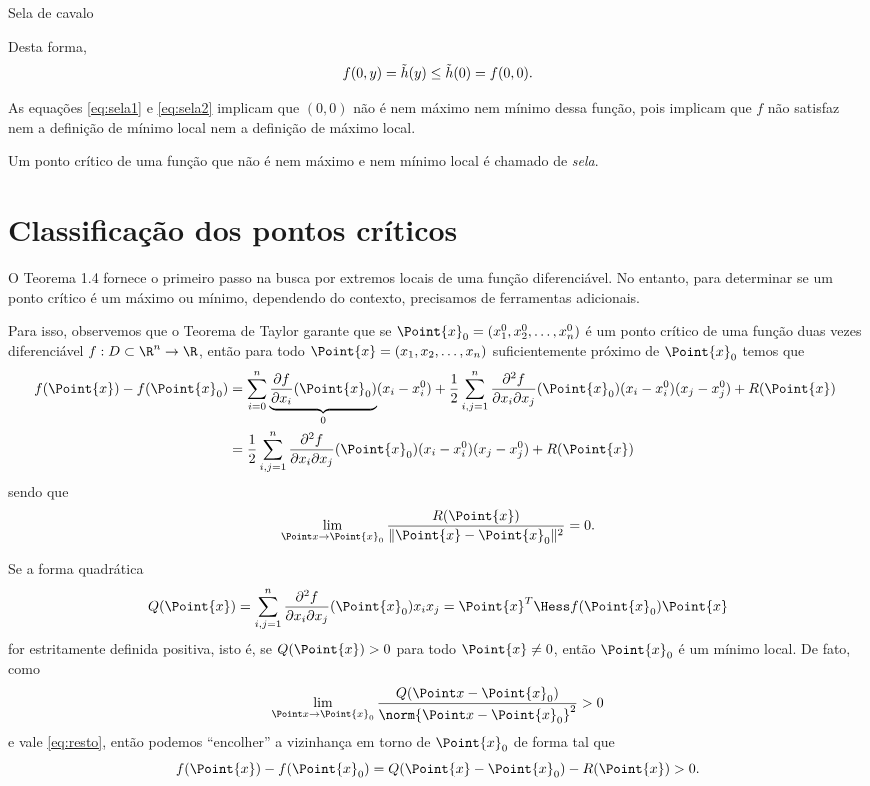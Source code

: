\begin{example}{Sela de cavalo}{}
\begin{figure}[H]
    \caption{}
    \label{fig:sela2}
\end{figure}
Desta forma, 
\begin{equation}
f(0,y)=\Tilde{h}(y)\leq \Tilde{h}(0)=f(0,0).
\label{eq:sela2}
\end{equation}

As equações \eqref{eq:sela1} e \eqref{eq:sela2} implicam que $(0,0)$ não é nem máximo nem mínimo dessa função, pois implicam que $f$ não satisfaz nem a definição de mínimo local nem a definição de máximo local. 
\end{example}

\begin{definition}{}{}
    Um ponto crítico de uma função que não é nem máximo e nem mínimo local é chamado de \textit{sela}.  
\end{definition}

\section{Classificação dos pontos críticos}
O Teorema 1.4 fornece o primeiro passo na busca por extremos locais de uma função diferenciável. No entanto, para determinar se um ponto crítico é um máximo ou mínimo, dependendo do contexto, precisamos de ferramentas adicionais.

Para isso, observemos que o Teorema de Taylor garante que se $\Point{x}_0=(x_1^0,x_2^0,\dots,x_n^0)$ é um ponto crítico de uma função duas vezes diferenciável $f:D\subset\R^n\to\R$, então para todo $\Point{x}=(x_1,x_2,\dots,x_n)$ suficientemente próximo de $\Point{x}_0$ temos que
\begin{align*}
\!\!f(\Point{x})-f(\Point{x}_0)&= \sum_{i=0}^n \underbrace{\dfrac{\partial f}{\partial x_i} (\Point{x}_0)}_{0} (x_i-x_i^0) + \frac{1}{2}\sum_{i,j=1}^n \dfrac{\partial ^2 f}{\partial x_i \partial x_j}(\Point{x}_0)(x_i-x_i^0)(x_j-x_j^0) + R(\Point{x})\\
&= \frac{1}{2} \sum_{i,j=1}^n \dfrac{\partial ^2 f}{\partial x_i \partial x_j}(\Point{x}_0)(x_i-x_i^0)(x_j-x_j^0) + R(\Point{x})
\end{align*}
sendo que
\begin{equation}\label{eq:resto}
    \lim_{\Point x \rightarrow \Point{x}_0} \dfrac{R(\Point{x})}{\|\Point{x}-\Point{x}_0\|^2}=0. 
\end{equation}

Se a forma quadrática 
$$Q(\Point{x})=\sum_{i,j=1}^n \dfrac{\partial ^2 f}{\partial x_i \partial x_j}(\Point{x}_0)x_i x_j=\Point{x}^T \Hess f(\Point{x}_0)\Point{x}$$
for estritamente definida positiva, isto é, se $Q(\Point{x})>0$ para todo $\Point{x}\neq 0$, então $\Point{x}_0$ é um mínimo local. De fato, como
$$\lim_{\Point x \rightarrow \Point{x}_0} \dfrac{Q(\Point x -  \Point{x}_0)}{\norm{\Point x -  \Point{x}_0}^2} > 0$$
e vale \eqref{eq:resto}, então podemos ``encolher'' a vizinhança em torno de $\Point{x}_0$ de forma tal que  
$$f(\Point{x})-f(\Point{x}_0)=Q(\Point{x}-\Point{x}_0)-R(\Point{x})>0.$$ 

